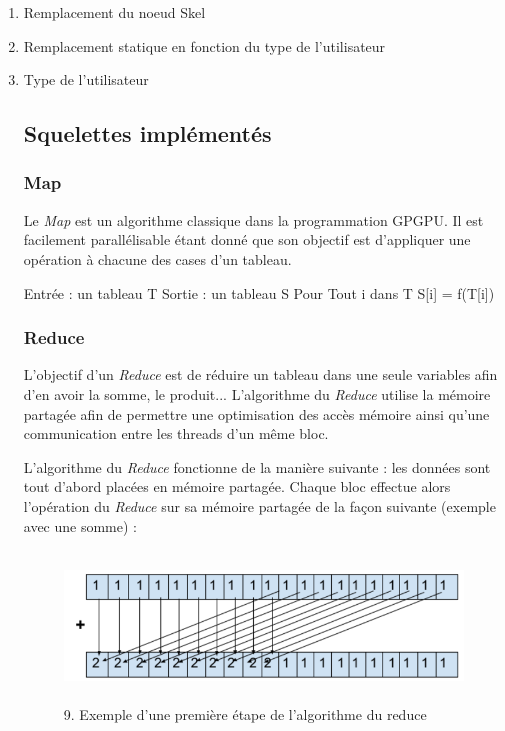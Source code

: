 \documentclass{report}
\begin{document}
\begin{itemize}
\begin{enumerate}
\item Remplacement du noeud Skel
\item Remplacement statique en fonction du type de l'utilisateur
\item Type de l'utilisateur

\subsection{Squelettes implémentés}
\subsubsection{Map}
Le \textit{Map} est un algorithme classique dans la programmation GPGPU. Il est facilement parallélisable étant donné que son objectif est d'appliquer une opération à chacune des cases d'un tableau.\newline

\begin{verbatimtab} 
Entrée : un tableau T
Sortie : un tableau S
Pour Tout i dans T
    S[i] = f(T[i])
\end{verbatimtab}

\subsubsection{Reduce}
L'objectif d'un \textit{Reduce} est de réduire un tableau dans une seule variables afin d'en avoir la somme, le produit...\newline
L'algorithme du \textit{Reduce} utilise la mémoire partagée afin de permettre une optimisation des accès mémoire ainsi qu'une communication entre les threads d'un même bloc.\newline

L'algorithme du \textit{Reduce} fonctionne de la manière suivante : les données sont tout d'abord placées en mémoire partagée. Chaque bloc effectue alors l'opération du \textit{Reduce} sur sa mémoire partagée de la façon suivante (exemple avec une somme) :

\begin{figure}[!h]
\begin{center}
\includegraphics[height=150]{images_finales/schema_reduce.png}
\end{center}
\caption{9. Exemple d'une première étape de l'algorithme du reduce}
\label{test}
\end{figure} \newline


\end{enumerate}
\end{itemize}
\end{document}
